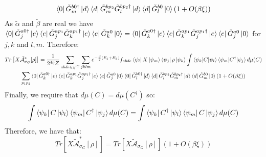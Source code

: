 \documentclass[aps,floatfix,10pt,amssymb,amsfont,amsmath,superscriptaddress,float,nofootinbib,longbibliography,nobalancelastpage,twocolumn]{revtex4-2}
\begin{document}
\begin{widetext}
\begin{multline}
    \bra{0}\tilde G_m^{b0\dagger}\ket{d}\bra{d}\tilde G_m^{bp_2}\tilde G_l^{bp_2\dagger}\ket{d}\bra{d}\tilde G_l^{b0}\ket{0}(1+O(\beta\xi))
\end{multline}
As $\tilde \alpha$ and $\tilde \beta$ are real we have $\bra{0} \tilde G^{a0\dagger}_j\ket{e}\bra{e}\tilde G^{ap_1}_j\tilde G^{ap_1\dagger}_k\ket{e}\bra{e}\tilde G^{a0}_k\ket{0} = \bra{0} \tilde G^{a0\dagger}_k\ket{e}\bra{e}\tilde G^{ap_1}_k\tilde G^{ap_1\dagger}_j\ket{e}\bra{e}\tilde G^{a0}_j\ket{0}$ for $j,k$ and $l,m$.
Therefore:
\begin{multline}
Tr\left[X\tilde{\mathcal{A}}^*_{\sigma_G}[\rho]\right] =\frac{1}{2^{4\eta}Z} \sum_{abde\in \chi'^C}\sum_{jklm} e^{-\frac{\beta}{2}(E_j+E_k)}f_{abde} \bra{\psi_l}X\ket{\psi_m}\bra{\psi_j}\rho\ket{\psi_k} \int \braket{\psi_k|C|\psi_l}\braket{\psi_m|C^{\dagger}|\psi_j} d\mu(C)\\\sum_{p_1p_2} \bra{0} \tilde G^{a0\dagger}_k\ket{e}\bra{e}\tilde G^{ap_1}_k\tilde G^{ap_1\dagger}_j\ket{e}\bra{e}\tilde G^{a0}_j\ket{0}
    \bra{0}\tilde G_l^{b0\dagger}\ket{d}\bra{d}\tilde G_l^{bp_2}\tilde G_m^{bp_2\dagger}\ket{d}\bra{d}\tilde G_m^{b0}\ket{0}(1+O(\beta\xi))
\end{multline}
Finally, we require that $d\mu(C) = d\mu(C^{\dagger})$ so:
\begin{equation}
    \int  \bra{\psi_k}C\ket{\psi_{l}}\bra{\psi_m}C^{\dagger} \ket{\psi_j} d\mu(C) = \int  \bra{\psi_k}C^{\dagger}\ket{\psi_{l}}\bra{\psi_m}C \ket{\psi_j} d\mu(C)
\end{equation}
Therefore, we have that:
\begin{equation}
    Tr\left[X\tilde{\mathcal{A}}^*_{\sigma_G}[\rho]\right] = Tr\left[X\tilde{\mathcal{A}}_{\sigma_G}[\rho]\right](1+O(\beta\xi))
\end{equation}


\end{widetext}
\end{document}
